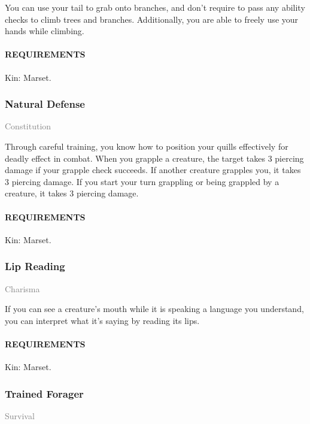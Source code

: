     \normalsize
    You can use your tail to grab onto branches, and don't require to pass any ability checks to climb trees and branches.
    Additionally, you are able to freely use your hands while climbing.
    \paragraph{REQUIREMENTS} Kin: Marset.

    \subsubsection{Natural Defense} \label{feat::naturaldefense}
    \small{\textcolor{gray}{Constitution}}

    \normalsize
    Through careful training, you know how to position your quills effectively for deadly effect in combat.
    When you grapple a creature, the target takes 3 piercing damage if your grapple check succeeds.
    If another creature grapples you, it takes 3 piercing damage.
    If you start your turn grappling or being grappled by a creature, it takes 3 piercing damage.
    \paragraph{REQUIREMENTS} Kin: Marset.

    \subsubsection{Lip Reading} \label{feat::lipreading}
    \small{\textcolor{gray}{Charisma}}

    \normalsize
    If you can see a creature's mouth while it is speaking a language you understand, you can interpret what it's saying by reading its lips.
    \paragraph{REQUIREMENTS} Kin: Marset.

    \subsubsection{Trained Forager} \label{feat::trainedforager}
    \small{\textcolor{gray}{Survival}}

